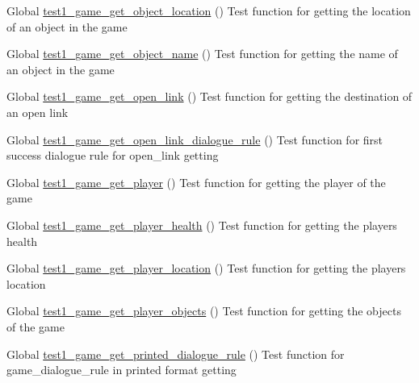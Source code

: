 \begin{DoxyRefList}
\item[Global \mbox{\hyperlink{game__test_8c_aff63179aad895eeb2f2d5571156fd387}{test1\+\_\+game\+\_\+get\+\_\+object\+\_\+location}} ()]\label{test__test000202}%
%
Test function for getting the location of an object in the game  
\item[Global \mbox{\hyperlink{game__test_8c_a6d6f58853f24ec4056422acd21b0c32f}{test1\+\_\+game\+\_\+get\+\_\+object\+\_\+name}} ()]\label{test__test000198}%
%
Test function for getting the name of an object in the game  
\item[Global \mbox{\hyperlink{game__test_8c_a9f3cf4ef9569ddc289163ad73ecf549f}{test1\+\_\+game\+\_\+get\+\_\+open\+\_\+link}} ()]\label{test__test000261}%
%
Test function for getting the destination of an open link  
\item[Global \mbox{\hyperlink{game__test_8c_a927c02197bae59f3ded1a10049c027e7}{test1\+\_\+game\+\_\+get\+\_\+open\+\_\+link\+\_\+dialogue\+\_\+rule}} ()]\label{test__test000367}%
%
Test function for first success dialogue rule for open\+\_\+link getting  
\item[Global \mbox{\hyperlink{game__test_8c_a867c32166bda065e0c64a4a7c8e7b6d8}{test1\+\_\+game\+\_\+get\+\_\+player}} ()]\label{test__test000151}%
%
Test function for getting the player of the game  
\item[Global \mbox{\hyperlink{game__test_8c_a888f5a3a460ac044ff64c486af109e29}{test1\+\_\+game\+\_\+get\+\_\+player\+\_\+health}} ()]\label{test__test000165}%
%
Test function for getting the player\textquotesingle{}s health  
\item[Global \mbox{\hyperlink{game__test_8c_aa387108e95dba4762d0f2cbfdbf30cd3}{test1\+\_\+game\+\_\+get\+\_\+player\+\_\+location}} ()]\label{test__test000159}%
%
Test function for getting the player\textquotesingle{}s location  
\item[Global \mbox{\hyperlink{game__test_8c_add1664b3898f0c6518bae884abc618da}{test1\+\_\+game\+\_\+get\+\_\+player\+\_\+objects}} ()]\label{test__test000156}%
%
Test function for getting the objects of the game  
\item[Global \mbox{\hyperlink{game__test_8c_afe572655d61a0681ce7c67505085e4d9}{test1\+\_\+game\+\_\+get\+\_\+printed\+\_\+dialogue\+\_\+rule}} ()]\label{test__test000311}%
%
Test function for game\+\_\+dialogue\+\_\+rule in printed format getting  

\end{DoxyRefList}
